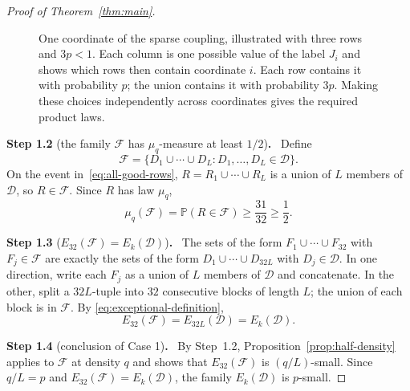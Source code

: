 \documentclass[11pt,letterpaper]{article}
\theoremstyle{definition}
\theoremstyle{remark}
\numberwithin{equation}{section}
\newcommand{\step}[2]{\medskip\noindent\textbf{Step #1} (#2)\textbf{.}\ }
\begin{document}
\begin{proof}[Proof of Theorem~\ref{thm:main}]
\begin{figure}[!ht]
\centering
{}
\caption{One coordinate of the sparse coupling, illustrated with three
rows and $3p<1$. Each column is one possible value of the label $J_i$ and
shows which rows then contain coordinate $i$. Each row contains it with
probability $p$; the union contains it with probability $3p$. Making these
choices independently across coordinates gives the required product laws.}
\label{fig:coupling}
\end{figure}

\step{1.2}{the family $\mathcal F$ has $\mu_q$-measure at least $1/2$}
Define
\[
\mathcal F
=\{D_1\cup\cdots\cup D_L:D_1,\ldots,D_L\in\mathcal D\}.
\]
On the event in~\eqref{eq:all-good-rows}, $R=R_1\cup\cdots\cup R_L$ is a
union of $L$ members of $\mathcal D$, so $R\in\mathcal F$. Since $R$ has
law $\mu_q$,
\[
\mu_q(\mathcal F)=\mathbb P(R\in\mathcal F)
\ge\frac{31}{32}\ge\frac12.
\]

\step{1.3}{$E_{32}(\mathcal F)=E_k(\mathcal D)$}
The sets of the form $F_1\cup\cdots\cup F_{32}$ with $F_j\in\mathcal F$
are exactly the sets of the form $D_1\cup\cdots\cup D_{32L}$ with
$D_j\in\mathcal D$. In one direction, write each $F_j$ as a union of $L$
members of $\mathcal D$ and concatenate. In the other, split a
$32L$-tuple into $32$ consecutive blocks of length $L$; the union of each
block is in $\mathcal F$. By \eqref{eq:exceptional-definition},
\[
E_{32}(\mathcal F)=E_{32L}(\mathcal D)=E_k(\mathcal D).
\]

\step{1.4}{conclusion of Case 1}
By Step~1.2, Proposition~\ref{prop:half-density} applies to $\mathcal F$
at density $q$ and shows that $E_{32}(\mathcal F)$ is $(q/L)$-small. Since
$q/L=p$ and $E_{32}(\mathcal F)=E_k(\mathcal D)$, the family
$E_k(\mathcal D)$ is $p$-small.


\end{proof}
\end{document}
